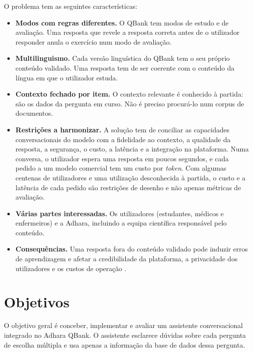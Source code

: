 O problema tem as seguintes características:
\begin{itemize}
    \item \textbf{Modos com regras diferentes.} O QBank tem modos de estudo e de avaliação. Uma resposta que revele a resposta correta antes de o utilizador responder anula o exercício num modo de avaliação.
    \item \textbf{Multilinguismo.} Cada versão linguística do QBank tem o seu próprio conteúdo validado. Uma resposta tem de ser coerente com o conteúdo da língua em que o utilizador estuda.
    \item \textbf{Contexto fechado por item.} O contexto relevante é conhecido à partida: são os dados da pergunta em curso. Não é preciso procurá-lo num corpus de documentos.
    \item \textbf{Restrições a harmonizar.} A solução tem de conciliar as capacidades conversacionais do modelo com a fidelidade ao contexto, a qualidade da resposta, a segurança, o custo, a latência e a integração na plataforma. Numa conversa, o utilizador espera uma resposta em poucos segundos, e cada pedido a um modelo comercial tem um custo por \emph{token}. Com algumas centenas de utilizadores e uma utilização desconhecida à partida, o custo e a latência de cada pedido são restrições de desenho e não apenas métricas de avaliação.
    \item \textbf{Várias partes interessadas.} Os utilizadores (estudantes, médicos e enfermeiros) e a Adhara, incluindo a equipa científica responsável pelo conteúdo.
    \item \textbf{Consequências.} Uma resposta fora do conteúdo validado pode induzir erros de aprendizagem e afetar a credibilidade da plataforma, a privacidade dos utilizadores e os custos de operação \parencite{abdalrazaq2023llm,hu2025advancing}.
\end{itemize}

\section{Objetivos}
\label{sec:chap1_objectives}

O objetivo geral é conceber, implementar e avaliar um assistente conversacional integrado no Adhara QBank. O assistente esclarece dúvidas sobre cada pergunta de escolha múltipla e usa apenas a informação da base de dados dessa pergunta.

